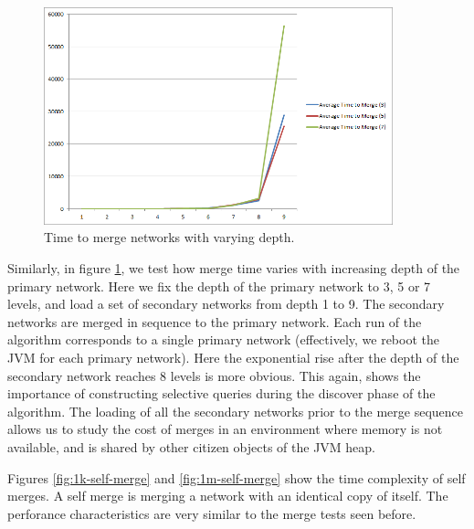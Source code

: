 \begin{figure}[t]
\centering
\includegraphics[width=0.9\textwidth]{media/chapter5/perf/mergedepthtest.png}
\caption{Time to merge networks with varying depth.}
\label{fig:agg-depth}
\end{figure}

Similarly, in figure \ref{fig:agg-depth}, we test how merge time varies with increasing depth of the primary network. Here we fix the depth of the primary network to 3, 5 or 7 levels, and load a set of secondary networks from depth 1 to 9. The secondary networks are merged in sequence to the primary network. Each run of the algorithm corresponds to a single primary network (effectively, we reboot the JVM for each primary network). Here the exponential rise after the depth of the secondary network reaches 8 levels is more obvious. This again, shows the importance of constructing selective queries during the discover phase of the algorithm. The loading of all the secondary networks prior to the merge sequence allows us to study the cost of merges in an environment where  memory is not available, and is shared by other citizen objects of the JVM heap. 

Figures \ref{fig:1k-self-merge} and \ref{fig:1m-self-merge} show the time complexity of self merges. A self merge is merging a network with an identical copy of itself. The perforance characteristics are very similar to the merge tests seen before.


